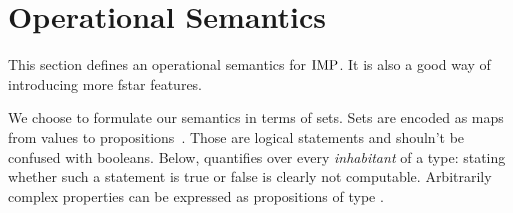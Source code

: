 \documentclass{llncs}
\begin{document}
\section{Operational Semantics}
\label{abint:section:operational-sematics}
%
This section defines an operational semantics for $\textrm{IMP}{}$. It is
also a good way of introducing more \gls{fstar} features.
%

We choose to formulate our semantics in terms of sets.
%
Sets are encoded as maps from values to propositions~.
%
Those are logical statements and shouln't be confused with
booleans.
%
Below,  quantifies over every \emph{inhabitant} of a
type: stating whether such a statement is true or false is clearly
not computable.
%
Arbitrarily complex properties can be expressed as propositions of
type .
%
\end{document}
